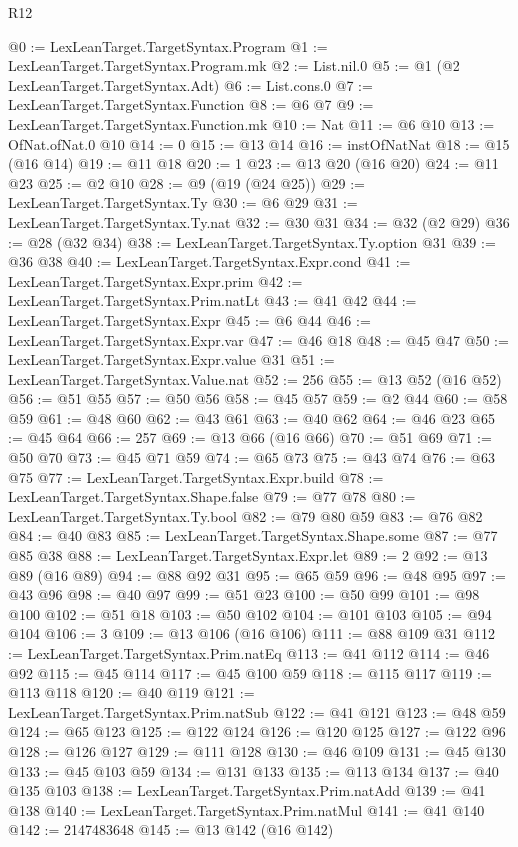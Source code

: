 \begin{lexlean}{R12}
\begin{coremodule}
@0 := LexLeanTarget.TargetSyntax.Program
@1 := LexLeanTarget.TargetSyntax.Program.mk
@2 := List.nil.{0}
@5 := @1 (@2 LexLeanTarget.TargetSyntax.Adt)
@6 := List.cons.{0}
@7 := LexLeanTarget.TargetSyntax.Function
@8 := @6 @7
@9 := LexLeanTarget.TargetSyntax.Function.mk
@10 := Nat
@11 := @6 @10
@13 := OfNat.ofNat.{0} @10
@14 := 0
@15 := @13 @14
@16 := instOfNatNat
@18 := @15 (@16 @14)
@19 := @11 @18
@20 := 1
@23 := @13 @20 (@16 @20)
@24 := @11 @23
@25 := @2 @10
@28 := @9 (@19 (@24 @25))
@29 := LexLeanTarget.TargetSyntax.Ty
@30 := @6 @29
@31 := LexLeanTarget.TargetSyntax.Ty.nat
@32 := @30 @31
@34 := @32 (@2 @29)
@36 := @28 (@32 @34)
@38 := LexLeanTarget.TargetSyntax.Ty.option @31
@39 := @36 @38
@40 := LexLeanTarget.TargetSyntax.Expr.cond
@41 := LexLeanTarget.TargetSyntax.Expr.prim
@42 := LexLeanTarget.TargetSyntax.Prim.natLt
@43 := @41 @42
@44 := LexLeanTarget.TargetSyntax.Expr
@45 := @6 @44
@46 := LexLeanTarget.TargetSyntax.Expr.var
@47 := @46 @18
@48 := @45 @47
@50 := LexLeanTarget.TargetSyntax.Expr.value @31
@51 := LexLeanTarget.TargetSyntax.Value.nat
@52 := 256
@55 := @13 @52 (@16 @52)
@56 := @51 @55
@57 := @50 @56
@58 := @45 @57
@59 := @2 @44
@60 := @58 @59
@61 := @48 @60
@62 := @43 @61
@63 := @40 @62
@64 := @46 @23
@65 := @45 @64
@66 := 257
@69 := @13 @66 (@16 @66)
@70 := @51 @69
@71 := @50 @70
@73 := @45 @71 @59
@74 := @65 @73
@75 := @43 @74
@76 := @63 @75
@77 := LexLeanTarget.TargetSyntax.Expr.build
@78 := LexLeanTarget.TargetSyntax.Shape.false
@79 := @77 @78
@80 := LexLeanTarget.TargetSyntax.Ty.bool
@82 := @79 @80 @59
@83 := @76 @82
@84 := @40 @83
@85 := LexLeanTarget.TargetSyntax.Shape.some
@87 := @77 @85 @38
@88 := LexLeanTarget.TargetSyntax.Expr.let
@89 := 2
@92 := @13 @89 (@16 @89)
@94 := @88 @92 @31
@95 := @65 @59
@96 := @48 @95
@97 := @43 @96
@98 := @40 @97
@99 := @51 @23
@100 := @50 @99
@101 := @98 @100
@102 := @51 @18
@103 := @50 @102
@104 := @101 @103
@105 := @94 @104
@106 := 3
@109 := @13 @106 (@16 @106)
@111 := @88 @109 @31
@112 := LexLeanTarget.TargetSyntax.Prim.natEq
@113 := @41 @112
@114 := @46 @92
@115 := @45 @114
@117 := @45 @100 @59
@118 := @115 @117
@119 := @113 @118
@120 := @40 @119
@121 := LexLeanTarget.TargetSyntax.Prim.natSub
@122 := @41 @121
@123 := @48 @59
@124 := @65 @123
@125 := @122 @124
@126 := @120 @125
@127 := @122 @96
@128 := @126 @127
@129 := @111 @128
@130 := @46 @109
@131 := @45 @130
@133 := @45 @103 @59
@134 := @131 @133
@135 := @113 @134
@137 := @40 @135 @103
@138 := LexLeanTarget.TargetSyntax.Prim.natAdd
@139 := @41 @138
@140 := LexLeanTarget.TargetSyntax.Prim.natMul
@141 := @41 @140
@142 := 2147483648
@145 := @13 @142 (@16 @142)

\end{coremodule}
\end{lexlean}
